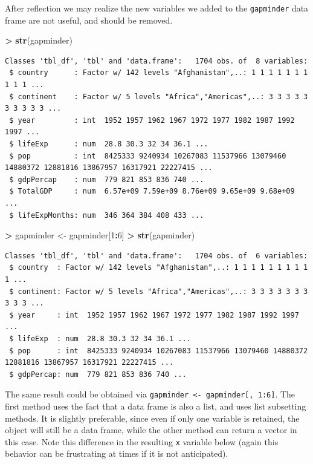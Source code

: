 \documentclass[]{krantz}
\makeatletter
\newenvironment{Shaded}{\begin{snugshade}}{\end{snugshade}}
\newcommand{\DecValTok}[1]{\textcolor[rgb]{0.06,0.06,0.06}{#1}}
\newcommand{\KeywordTok}[1]{\textcolor[rgb]{0.27,0.27,0.27}{\textbf{#1}}}
\newcommand{\NormalTok}[1]{#1}
\newcommand{\OperatorTok}[1]{\textcolor[rgb]{0.43,0.43,0.43}{\textbf{#1}}}
\newcommand{\StringTok}[1]{\textcolor[rgb]{0.5,0.5,0.5}{#1}}
\newenvironment{kframe}{%
\medskip{}
\setlength{\fboxsep}{.8em}
 \def\at@end@of@kframe{}%
 \ifinner\ifhmode%
  \def\at@end@of@kframe{\end{minipage}}%
  \begin{minipage}{\columnwidth}%
 \fi\fi%
 \def\FrameCommand##1{\hskip\@totalleftmargin \hskip-\fboxsep
 \colorbox{shadecolor}{##1}\hskip-\fboxsep
     \hskip-\linewidth \hskip-\@totalleftmargin \hskip\columnwidth}%
 \MakeFramed {\advance\hsize-\width
   \@totalleftmargin\z@ \linewidth\hsize
   \@setminipage}}%
 {\par\unskip\endMakeFramed%
 \at@end@of@kframe}
\renewenvironment{Shaded}{\begin{kframe}}{\end{kframe}}
\makeatother
\begin{document}
After reflection we may realize the new variables we added to the \texttt{gapminder} data frame are not useful, and should be removed.

\begin{Shaded}
\begin{Highlighting}[]
\OperatorTok{>}\StringTok{ }\KeywordTok{str}\NormalTok{(gapminder)}
\end{Highlighting}
\end{Shaded}

\begin{verbatim}
Classes 'tbl_df', 'tbl' and 'data.frame':   1704 obs. of  8 variables:
 $ country      : Factor w/ 142 levels "Afghanistan",..: 1 1 1 1 1 1 1 1 1 1 ...
 $ continent    : Factor w/ 5 levels "Africa","Americas",..: 3 3 3 3 3 3 3 3 3 3 ...
 $ year         : int  1952 1957 1962 1967 1972 1977 1982 1987 1992 1997 ...
 $ lifeExp      : num  28.8 30.3 32 34 36.1 ...
 $ pop          : int  8425333 9240934 10267083 11537966 13079460 14880372 12881816 13867957 16317921 22227415 ...
 $ gdpPercap    : num  779 821 853 836 740 ...
 $ TotalGDP     : num  6.57e+09 7.59e+09 8.76e+09 9.65e+09 9.68e+09 ...
 $ lifeExpMonths: num  346 364 384 408 433 ...
\end{verbatim}

\begin{Shaded}
\begin{Highlighting}[]
\OperatorTok{>}\StringTok{ }\NormalTok{gapminder <-}\StringTok{ }\NormalTok{gapminder[}\DecValTok{1}\OperatorTok{:}\DecValTok{6}\NormalTok{]}
\OperatorTok{>}\StringTok{ }\KeywordTok{str}\NormalTok{(gapminder)}
\end{Highlighting}
\end{Shaded}

\begin{verbatim}
Classes 'tbl_df', 'tbl' and 'data.frame':   1704 obs. of  6 variables:
 $ country  : Factor w/ 142 levels "Afghanistan",..: 1 1 1 1 1 1 1 1 1 1 ...
 $ continent: Factor w/ 5 levels "Africa","Americas",..: 3 3 3 3 3 3 3 3 3 3 ...
 $ year     : int  1952 1957 1962 1967 1972 1977 1982 1987 1992 1997 ...
 $ lifeExp  : num  28.8 30.3 32 34 36.1 ...
 $ pop      : int  8425333 9240934 10267083 11537966 13079460 14880372 12881816 13867957 16317921 22227415 ...
 $ gdpPercap: num  779 821 853 836 740 ...
\end{verbatim}

The same result could be obtained via \texttt{gapminder\ \textless{}-\ gapminder{[},\ 1:6{]}}. The first method uses the fact that a data frame is also a list, and uses list subsetting methods. It is slightly preferable, since even if only one variable is retained, the object will still be a data frame, while the other method can return a vector in this case. Note this difference in the resulting \texttt{x} variable below (again this behavior can be frustrating at times if it is not anticipated).
\end{document}
